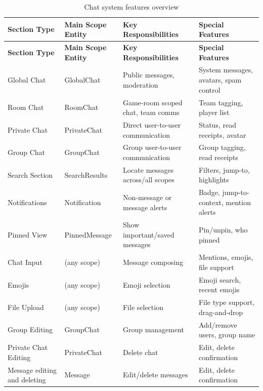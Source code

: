 \documentclass[]{VUMIFTemplateClass}
\begin{document}
\begin{longtable}{|p{}|p{}|p{}|p{}|}
    \caption{Chat system features overview} \label{tab:chat-system-features} \\

    \hline
    \textbf{Section Type} & \textbf{Main Scope Entity} & \textbf{Key Responsibilities} & \textbf{Special Features} \\
    \hline
    \endfirsthead

    \hline
    \textbf{Section Type} & \textbf{Main Scope Entity} & \textbf{Key Responsibilities} & \textbf{Special Features} \\
    \hline
    \endhead

    \hline
    \endfoot

    \hline
    \endlastfoot

    Global Chat & GlobalChat & Public messages, moderation & System messages, avatars, spam control \\
    \hline
    Room Chat & RoomChat & Game-room scoped chat, team comms & Team tagging, player list \\
    \hline
    Private Chat & PrivateChat & Direct user-to-user communication & Status, read receipts, avatar \\
    \hline
    Group Chat & GroupChat & Group user-to-user communication & Group tagging, read receipts \\
    \hline
    Search Section & SearchResults & Locate messages across/all scopes & Filters, jump-to, highlights \\
    \hline
    Notifications & Notification & Non-message or message alerts & Badge, jump-to-context, mention alerts \\
    \hline
    Pinned View & PinnedMessage & Show important/saved messages & Pin/unpin, who pinned \\
    \hline
    Chat Input & (any scope) & Message composing & Mentions, emojis, file support \\
    \hline
    Emojis & (any scope) & Emoji selection & Emoji search, recent emojis \\
    \hline
    File Upload & (any scope) & File selection & File type support, drag-and-drop \\
    \hline
    Group Editing & GroupChat & Group management & Add/remove users, group name \\
    \hline
    Private Chat Editing & PrivateChat & Delete chat & Edit, delete confirmation \\
    \hline
    Message editing and deleting & Message & Edit/delete messages & Edit, delete confirmation \\
    \hline
\end{longtable}
\end{document}

